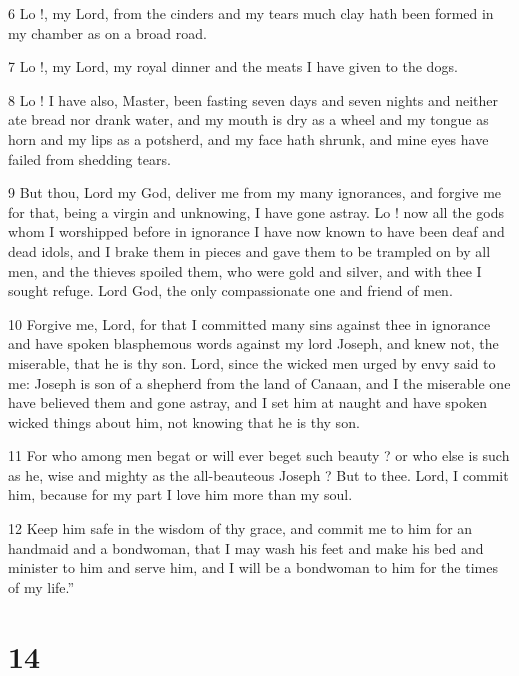 \par 6 Lo !, my Lord, from the cinders and my tears much clay hath been formed in my chamber as on a broad road. 

\par 7 Lo !, my Lord, my royal dinner and the meats I have given to the dogs. 

\par 8 Lo ! I have also, Master, been fasting seven days and seven nights and neither ate bread nor drank water, and my mouth is dry as a wheel and my tongue as horn and my lips as a potsherd, and my face hath shrunk, and mine eyes have failed from shedding tears. 

\par 9 But thou, Lord my God, deliver me from my many ignorances, and forgive me for that, being a virgin and unknowing, I have gone astray. Lo ! now all the gods whom I worshipped before in ignorance I have now known to have been deaf and dead idols, and I brake them in pieces and gave them to be trampled on by all men, and the thieves spoiled them, who were gold and silver, and with thee I sought refuge. Lord God, the only compassionate one and friend of men. 

\par 10 Forgive me, Lord, for that I committed many sins against thee in ignorance and have spoken blasphemous words against my lord Joseph, and knew not, the miserable, that he is thy son. Lord, since the wicked men urged by envy said to me: Joseph is son of a shepherd from the land of Canaan, and I the miserable one have believed them and gone astray, and I set him at naught and have spoken wicked things about him, not knowing that he is thy son. 

\par 11 For who among men begat or will ever beget such beauty ? or who else is such as he, wise and mighty as the all-beauteous Joseph ? But to thee. Lord, I commit him, because for my part I love him more than my soul. 

\par 12 Keep him safe in the wisdom of thy grace, and commit me to him for an handmaid and a bondwoman, that I may wash his feet and make his bed and minister to him and serve him, and I will be a bondwoman to him for the times of my life.”

\chapter{14}

